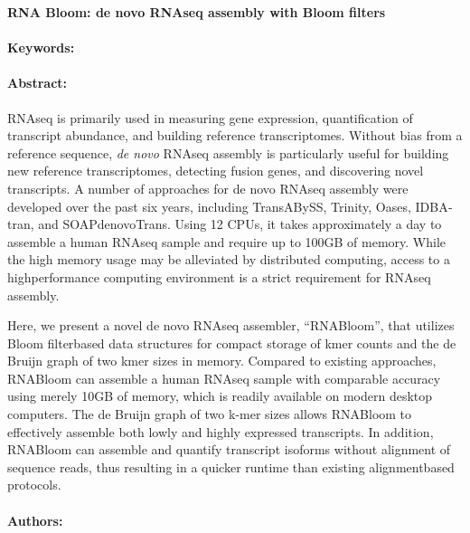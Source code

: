 \noindent
\large {\bf RNA Bloom: de novo RNAseq assembly with Bloom filters} 


\normalsize 


\noindent \paragraph{Keywords:} 

\noindent \paragraph{Abstract:} 

RNA­seq is primarily used in measuring gene expression, quantification of transcript abundance, and building reference transcriptomes. Without bias from a reference sequence, 
{\it de novo} RNA­seq assembly is   particularly   useful   for   building   new   reference   transcriptomes,  
detecting   fusion   genes,   and   discovering   novel   transcripts.   A   number   of   approaches   for   de   novo  
RNA­seq   assembly   were   developed   over   the   past   six   years,   including   Trans­ABySS,   Trinity,  
Oases,   IDBA­tran,   and   SOAPdenovo­Trans.   Using   12   CPUs,   it   takes   approximately   a   day   to  
assemble   a   human   RNA­seq   sample   and   require   up   to   100GB   of   memory.   While   the   high  
memory   usage   may   be   alleviated   by   distributed   computing,   access   to   a   high­performance  
computing environment is a strict requirement for RNA­seq assembly. 

Here,   we   present   a   novel   de   novo   RNA­seq   assembler,   ``RNA­Bloom'',   that   utilizes  
Bloom   filter­based   data   structures   for   compact   storage   of   k­mer   counts   and   the   de   Bruijn   graph  
of   two   k­mer   sizes   in   memory.   Compared   to   existing   approaches,   RNA­Bloom   can   assemble   a  
human   RNA­seq   sample   with   comparable   accuracy   using   merely   10GB   of   memory,   which   is  
readily   available   on   modern   desktop   computers.   The   de   Bruijn   graph   of   two   k-mer   sizes   allows  
RNA­Bloom   to   effectively   assemble   both   lowly   and   highly   expressed   transcripts.   In   addition,  
RNA­Bloom   can   assemble   and   quantify   transcript   isoforms   without   alignment   of   sequence   reads,  
thus resulting in a quicker run­time than existing alignment­based protocols. 

\noindent \paragraph{Authors:} 

